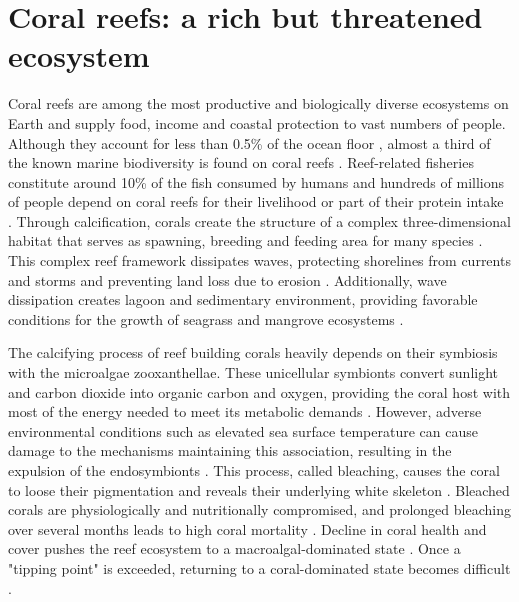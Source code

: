 \documentclass[12pt ,a4paper]{article}
\begin{document}
\section{Coral reefs: a rich but threatened ecosystem}

Coral reefs are among the most productive and biologically diverse ecosystems on Earth \citep{connell1978diversity, moberg1999ecological} and supply food, income and coastal protection to vast numbers of people. Although they account for less than 0.5\% of the ocean floor \citep{spalding1997new}, almost a third of the known marine biodiversity is found on coral reefs \citep{moberg1999ecological}. Reef-related fisheries constitute around 10\% of the fish consumed by humans \citep{smith1978coral} and hundreds of millions of people depend on coral reefs for their livelihood or part of their protein intake \citep{salvat1992coral,hoegh2019people}. Through calcification, corals create the structure of a complex three-dimensional habitat that serves as spawning, breeding and feeding area for many species \citep{moberg1999ecological}. This complex reef framework  dissipates waves, protecting shorelines from currents and storms and preventing land loss due to erosion \citep{ferrario2014effectiveness,elliff2017coral}. Additionally, wave dissipation creates lagoon and sedimentary environment, providing favorable conditions for the growth of seagrass and mangrove ecosystems \citep{moberg1999ecological}.

The calcifying process of reef building corals heavily depends on their symbiosis with the microalgae zooxanthellae. These unicellular symbionts convert sunlight and carbon dioxide into organic carbon and oxygen, providing the coral host with most of the energy needed to meet its metabolic demands \citep{muscatine1977reef}. However, adverse environmental conditions such as elevated sea surface temperature can cause damage to the mechanisms maintaining this association, resulting in the expulsion of the endosymbionts \citep{hoegh2007coral}. This process, called bleaching, causes the coral to loose their pigmentation and reveals their underlying white skeleton \citep{baker2008climate}. Bleached corals are physiologically and nutritionally compromised, and prolonged bleaching over several months leads to high coral mortality \citep{hughes2018spatial}. Decline in coral health and cover pushes the reef ecosystem to a macroalgal-dominated state \citep{hughes2003climate,mumby2007thresholds}. Once a "tipping point" is exceeded, returning to a coral-dominated state becomes difficult \citep{mumby2007thresholds,graham2015predicting}.
\end{document}
